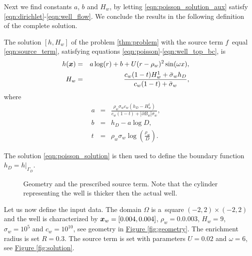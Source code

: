 \documentclass[dvipsnames,FM,Dis]{tulthesis}
\newcommand{\fig}[1]{\hyperref[#1]{Figure \ref{#1}}}
\newcommand{\results}{results/}
\begin{document}
Next we find constants $a$, $b$ and $H_w$, by letting \eqref{eqn:poisson_solution_aux} satisfy \eqref{eqn:dirichlet}-\eqref{eqn:well_flow}.
We conclude the results in the following definition of the complete solution.
\begin{definition} \label{def:solution}
The solution $[h,H_w]$ of the problem \ref{thm:problem}
with the source term $f$~equal \eqref{eqn:source_term},
satisfying equations \eqref{eqn:poisson}-\eqref{eqn:well_top_bc}, is
\begin{eqnarray}
  h(\mathbf{\boldsymbol{x}}) &=& a\log(r) + b + U(r-\rho_w)^2 \sin(\omega x), \label{eqn:poisson_solution}\\
  H_w &=& \frac{c_w(1-t) H^1_w + \bar{\sigma}_w h_D}{c_w(1-t) + \bar{\sigma}_w}, \label{eqn:well_solution}
\end{eqnarray}
where
\begin{eqnarray}
  a &=& \frac{\rho_w\sigma_w c_w (h_D-H^1_w)}{c_w(1-t) + |\partial B_w|\sigma_w}, \nonumber \\
  b &=& h_D - a\log D, \nonumber \\
  t &=& \rho_w\sigma_w\log\left(\frac{\rho_w}{D}\right). \nonumber
\end{eqnarray}
\end{definition}

The solution \eqref{eqn:poisson_solution} is then used to define the boundary function $h_D = h|_{\Gamma_D}$.

\begin{figure}[!htb]
  \centering    
  \hspace{5pt}
  \caption[]
  {Geometry and the prescribed source term. Note that the cylinder representing the well is thicker then the actual well.}
\end{figure}

Let us now define the input data. The domain $\Omega$ is a~square $(-2,2)\times(-2,2)$ and the well is characterized by 
$\mathbf{\boldsymbol{x}}_w=[0.004,0.004]$,  $\rho_w=0.0.003$, $H_w=9$, $\sigma_w=10^5$ and $c_w=10^{10}$, see geometry in \fig{fig:geometry}. 
The enrichment radius is set $R=0.3$.
The source term is set with parameters $U=0.02$ and $\omega=6$, see \fig{fig:solution}.
\end{document}
